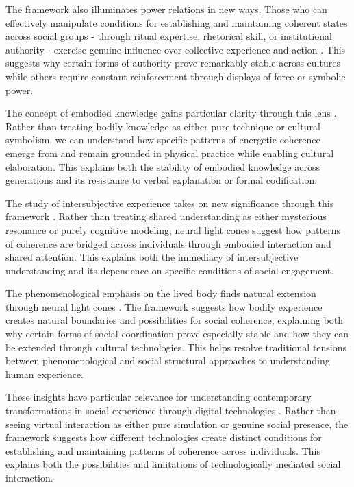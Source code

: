 \begin{refsection}
The framework also illuminates power relations in new ways. Those who can effectively manipulate conditions for establishing and maintaining coherent states across social groups - through ritual expertise, rhetorical skill, or institutional authority - exercise genuine influence over collective experience and action \cite{bourdieu1977outline}. This suggests why certain forms of authority prove remarkably stable across cultures while others require constant reinforcement through displays of force or symbolic power.

The concept of embodied knowledge gains particular clarity through this lens \cite{csordas1994embodiment}. Rather than treating bodily knowledge as either pure technique or cultural symbolism, we can understand how specific patterns of energetic coherence emerge from and remain grounded in physical practice while enabling cultural elaboration. This explains both the stability of embodied knowledge across generations and its resistance to verbal explanation or formal codification.

The study of intersubjective experience takes on new significance through this framework \cite{merleau2012phenomenology}. Rather than treating shared understanding as either mysterious resonance or purely cognitive modeling, neural light cones suggest how patterns of coherence are bridged across individuals through embodied interaction and shared attention. This explains both the immediacy of intersubjective understanding and its dependence on specific conditions of social engagement.

The phenomenological emphasis on the lived body finds natural extension through neural light cones \cite{jackson1989paths}. The framework suggests how bodily experience creates natural boundaries and possibilities for social coherence, explaining both why certain forms of social coordination prove especially stable and how they can be extended through cultural technologies. This helps resolve traditional tensions between phenomenological and social structural approaches to understanding human experience.

These insights have particular relevance for understanding contemporary transformations in social experience through digital technologies \cite{thompson2001radical}. Rather than seeing virtual interaction as either pure simulation or genuine social presence, the framework suggests how different technologies create distinct conditions for establishing and maintaining patterns of coherence across individuals. This explains both the possibilities and limitations of technologically mediated social interaction.


\end{refsection}
